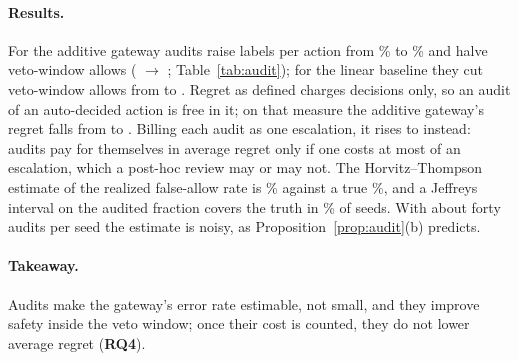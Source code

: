 \documentclass[11pt]{article}
\newcommand{\RQ}[1]{\textbf{RQ#1}}
\begin{document}
\begin{table}[t]
\centering
\small
{}
\caption{Auditing auto-decisions: random audits of $\varepsilon = 5\%$ of
auto-decided actions, symmetric costs, 10 seeds; arrows show no audits $\to$
audits. Regret charges decisions only, so audits are free in it; the value in
parentheses bills each audit as one escalation. The last columns compare the
Horvitz--Thompson estimate of the realized false-allow rate with its true
value, and give the share of seeds whose Jeffreys 95\% interval on the audited
fraction covers the truth.}
\label{tab:audit}
\end{table}

\paragraph{Results.} For the additive gateway audits raise labels per action
from \resALabels\% to \resAudALabels\% and halve veto-window allows
(\resAVeto{} $\to$ \resAudAVeto; Table~\ref{tab:audit}); for the linear
baseline they cut veto-window allows from \resLVeto{} to \resAudLVeto. Regret
as defined charges decisions only, so an audit of an auto-decided action is
free in it; on that measure the additive gateway's regret falls from
\resARegret{} to \resAudARegret. Billing each audit as one escalation, it
rises to \resAudACharged{} instead: audits pay for themselves in average
regret only if one costs at most \resAudABreakEven{} of an escalation, which a
post-hoc review may or may not. The Horvitz--Thompson estimate of the realized
false-allow rate is \resAudAEst\% against a true \resAudATruth\%, and a
Jeffreys interval on the audited fraction covers the truth in
\resAudACover\% of seeds. With about forty audits per seed the estimate is
noisy, as Proposition~\ref{prop:audit}(b) predicts.

\paragraph{Takeaway.} Audits make the gateway's error rate estimable, not
small, and they improve safety inside the veto window; once their cost is
counted, they do not lower average regret (\RQ4).
\end{document}
